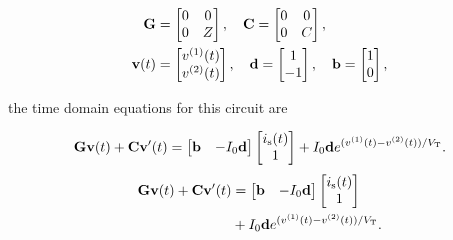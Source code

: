 \begin{equation}\label{eqn:ece1254projectReport:640}
\begin{aligned}
\BG &=
\begin{bmatrix}
0 & 0 \\
0 & Z \\
\end{bmatrix}, \quad
\BC =
\begin{bmatrix}
0 & 0 \\
0 & C \\
\end{bmatrix}, \\
\Bv(t) &=
\begin{bmatrix}
v^{(1)}(t) \\
v^{(2)}(t) \\
\end{bmatrix}, \quad
\Bd =
\begin{bmatrix}
1 \\
-1
\end{bmatrix}, \quad
\Bb =
\begin{bmatrix}
1 \\
0
\end{bmatrix},
\end{aligned}
\end{equation}

the time domain equations for this circuit are

\singleAndDoubleColumnVariations
{
\begin{dmath}\label{eqn:ece1254projectReport:1320}
\BG \Bv(t)
+\BC \Bv'(t)
=
\begin{bmatrix}
\Bb & -I_0 \Bd
\end{bmatrix}
\begin{bmatrix}
i_{\textrm{s}}(t) \\
1
\end{bmatrix} 
+
I_0 \Bd
e^{ (v^{(1)}(t) - v^{(2)}(t))/V_{\textrm{T}}}.
\end{dmath}
}
{
\begin{equation}\label{eqn:ece1254projectReport:1320}
\begin{aligned}
\BG \Bv(t)
+\BC \Bv'(t)
&=
\begin{bmatrix}
\Bb & -I_0 \Bd
\end{bmatrix}
\begin{bmatrix}
i_{\textrm{s}}(t) \\
1
\end{bmatrix} \\
&+
I_0 \Bd
e^{ (v^{(1)}(t) - v^{(2)}(t))/V_{\textrm{T}}}.
\end{aligned}
\end{equation}
}

